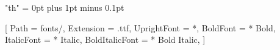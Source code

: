 
\usepackage{fontspec}
\usepackage{polyglossia}
\setdefaultlanguage{thai}

\XeTeXlinebreaklocale "th"
\XeTeXlinebreakskip = 0pt plus 1pt minus 0.1pt

\setmainfont{TH Sarabun New}[
  Path = fonts/,
  Extension = .ttf,
  UprightFont = *,
  BoldFont = * Bold,
  ItalicFont = * Italic,
  BoldItalicFont = * Bold Italic,
]

\usepackage[a4paper,
  top=3.00cm, bottom=2.54cm, left=3.81cm, right=2.54cm,
  headsep=1.25cm, footskip=1.25cm]{geometry}

\newcommand{\bodysize}{\fontsize{16}{24}\selectfont}
\newcommand{\hThreeSize}{\fontsize{16}{24}\selectfont\bfseries}
\newcommand{\hTwoSize}{\fontsize{18}{27}\selectfont\bfseries}
\newcommand{\hOneSize}{\fontsize{20}{30}\selectfont\bfseries}
\AtBeginDocument{\bodysize}

\usepackage{setspace}
\usepackage{indentfirst}
\setlength{\parindent}{1.25cm}

\newcommand{\paparttitle}[1]{%
  \addcontentsline{toc}{section}{#1}%
  {\hOneSize\centering #1\par}}
\newcommand{\padomaintitle}[1]{%
  \addcontentsline{toc}{subsection}{#1}%
  {\hTwoSize\centering #1\par}}
\newcommand{\paheading}[1]{%
  \addcontentsline{toc}{subsubsection}{#1}%
  \vspace{12pt}{\hTwoSize #1\par}\vspace{6pt}}
\newcommand{\pasubheading}[1]{\vspace{6pt}{\hThreeSize #1\par}\vspace{6pt}}
\setcounter{tocdepth}{3}

